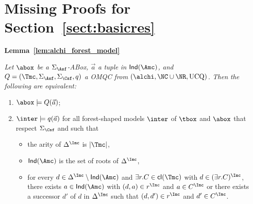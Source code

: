 \documentclass{lmcs}
\theoremstyle{definition}
\begin{document}
\section{Missing Proofs for Section~\ref{sect:basicres}}
{\bf Lemma~\ref{lem:alchi_forest_model}}
{\em  Let $\abox$ be a $\Sigma_{\Asf}$-ABox, $\vec{a}$ a tuple in ${\sf Ind}(\Amc)$, and
  $Q=(\Tmc,\Sigma_\Asf,\Sigma_\Csf,q)$ a OMQC from $(\alchi,\NC \cup
  \NR,\text{UCQ})$. Then the following are equivalent:
  \begin{enumerate}
  \item $\abox\models Q(\vec{a})$;
  \item $\inter\models q(\vec{a})$ for all forest-shaped models $\inter$ of $\tbox$ and $\abox$ that respect $\Sigma_\Csf$ and such that
     \begin{itemize}
            \item the arity of $\Delta^{\Imc}$ is $|\Tmc|$, 
            \item ${\sf Ind}(\Amc)$ is the set of roots of $\Delta^{\Imc}$,
            \item for every $d\in \Delta^{\Imc}\setminus {\sf Ind}(\Amc)$ and $\exists r.C\in {\sf cl}(\Tmc)$ with $d\in (\exists r.C)^{\Imc}$, there exists $a\in {\sf Ind}(\Amc)$ with $(d,a)\in r^{\Imc}$ and $a\in C^{\Imc}$ or 
there exists a successor $d'$ of $d$ in $\Delta^{\Imc}$
                  such that $(d,d')\in r^{\Imc}$ and $d'\in C^{\Imc}$.
     \end{itemize} 
  \end{enumerate}
}
\end{document}
